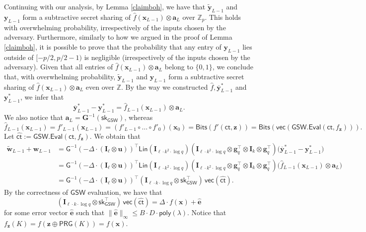\documentclass{article}
\newcommand{\Z}{\mathbb{Z}}
\newcommand{\poly}{\mathsf{poly}}
\renewcommand{\sec}{\ensuremath{\lambda}}
\newcommand{\ct}{\mathsf{ct}}
\newcommand{\BV}{\mathsf{GSW}}
\newcommand{\algofont}[1]{\ensuremath{\mathsf{#1}}}
\newcommand{\Eval}{\algofont{Eval}\xspace}
\newcommand{\id}{\ensuremath{\mathbf{I}}}
\newcommand{\sk}{{\mathsf{sk}}}
\begin{document}
Continuing with our analysis, by Lemma \ref{claimboh}, we have that $\tilde{\mathbf{y}}_{L-1}$ and $\mathbf{y}_{L-1}$ form a subtractive secret sharing of $\hat{f}(\mathbf{x}_{L-1})\otimes \mathbf{a}_{L}$ over $\Z_p$. {This holds with overwhelming probability, irrespectively of the inputs chosen by the adversary.} Furthermore, similarly to how we argued in the proof of Lemma \ref{claimboh}, it is possible to prove that the probability that any entry of $\mathbf{y}_{L-1}$ lies outside of $[-p/2, p/2-1)$ is negligible {(irrespectively of the inputs chosen by the adversary)}. Given that all entries of $\hat{f}(\mathbf{x}_{L-1})\otimes \mathbf{a}_{L}$ belong to $\{0, 1\}$, we conclude that, with overwhelming probability, $\tilde{\mathbf{y}}_{L-1}$ and $\mathbf{y}_{L-1}$ form a subtractive secret sharing of $\hat{f}(\mathbf{x}_{L-1})\otimes \mathbf{a}_{L}$ even over $\Z$. By the way we constructed $\hat{f}, \overline{\mathbf{y}}^\ast_{L-1}$ and $\mathbf{y}^\ast_{L-1}$, we infer that \[
\overline{\mathbf{y}}_{L-1}^\ast-\mathbf{y}^\ast_{L-1}
=\hat{f}_{L-1}(\mathbf{x}_{L-1})\otimes \mathbf{a}_{L}.
\]
We also notice that $\mathbf{a}_L=\mathbf{G}^{-1}(\sk_\BV)$, whereas
\[\hat{f}_{L-1}(\mathbf{x}_{L-1})=f'_{L-1}(\mathbf{x}_{L-1})=(f'_{L-1}\circ\dots \circ f'_0)(\mathbf{x}_0)=\mathsf{Bits}(f'(\ct, \mathbf{z}))=\mathsf{Bits}(\mathsf{vec}(\BV.\Eval(\ct, f_{\mathbf{z}}))).\]
Let $\hat{\ct}:=\BV.\Eval(\ct, f_{\mathbf{z}})$. We obtain that
\begin{align*}
\tilde{\mathbf{w}}_{L-1}+\mathbf{w}_{L-1}
&=\mathsf{G}^{-1}(-\Delta\cdot (\id_\ell\otimes \mathbf u))^\intercal
\mathsf{Lin}(\id_{\ell\cdot k^2\cdot \log q})
(\id_{\ell\cdot k^2\cdot \log q}\otimes \mathbf g_q^\intercal\otimes \id_k\otimes \mathbf g_q^\intercal)
\bigl(\overline{\mathbf y}^\ast_{L-1}-\mathbf{y}^\ast_{L-1}\bigr)\\
&=\mathsf{G}^{-1}(-\Delta\cdot (\id_\ell\otimes \mathbf u))^\intercal
\mathsf{Lin}(\id_{\ell\cdot k^2\cdot \log q})
(\id_{\ell\cdot k^2\cdot \log q}\otimes \mathbf g_q^\intercal\otimes \id_k\otimes \mathbf g_q^\intercal)
\bigl(\hat f_{L-1}(\mathbf x_{L-1})\otimes \mathbf a_L\bigr)\\
&=\mathsf{G}^{-1}(-\Delta\cdot (\id_\ell\otimes \mathbf u))^\intercal
(\id_{\ell\cdot k\cdot \log q}\otimes \sk_\BV^\intercal)\,\mathsf{vec}(\hat{\ct}).
\end{align*}
By the correctness of $\BV$ evaluation, we have that
\[
(\id_{\ell\cdot k\cdot \log q}\otimes \sk_\BV^\intercal)\,\mathsf{vec}(\hat{\ct})
=\Delta\cdot f(\mathbf{x})+\widehat{\mathbf e}
\]
for some error vector $\widehat{\mathbf e}$ such that $\lVert\widehat{\mathbf e}\rVert_\infty\le B\cdot D\cdot \poly(\sec)$. Notice that $f_{\mathbf{z}}(K)=f(\mathbf{z}\oplus \mathsf{PRG}(K))=f(\mathbf{x})$.
\end{document}
